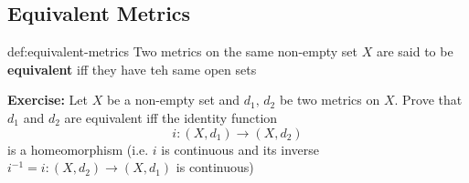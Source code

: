 \documentclass[landscape, 8pt]{extarticle}
\begin{document}
\begin{multicols}{3}
\subsection{Equivalent Metrics}
\begin{dfn}{def:equivalent-metrics}{}
    Two metrics on the same non-empty set $X$ are said to be \textbf{equivalent} iff they have teh same open sets
\end{dfn}

\textbf{Exercise:} Let $X$ be a non-empty set and $d_{1},\,d_{2}$ be two metrics on $X$. Prove that $d_{1}$ and $d_{2}$ are equivalent iff the identity function
\[i : (X, d_{1}) \to (X, d_{2})\]
is a homeomorphism (i.e. $i$ is continuous and its inverse $i^{-1} = i : (X, d_{2})\to (X, d_{1})$ is continuous)


\lipsum[1-12]
\end{multicols}
\end{document}
